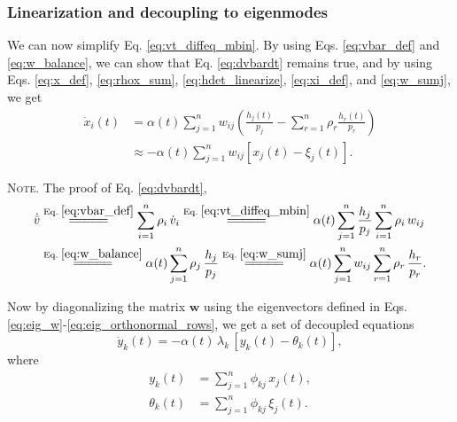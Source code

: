 \documentclass[reprint, floatfix]{revtex4-1}
\newcommand{\note}[1]{{\color{DarkGreen}\footnotesize \textsc{Note.} #1}}
\begin{document}
\subsubsection{Linearization and decoupling to eigenmodes}



We can now simplify Eq. \eqref{eq:vt_diffeq_mbin}.
%
By using Eqs. \eqref{eq:vbar_def}
and \eqref{eq:w_balance},
we can show that Eq. \eqref{eq:dvbardt}
remains true,
and by using Eqs.
\eqref{eq:x_def},
\eqref{eq:rhox_sum},
\eqref{eq:hdet_linearize},
\eqref{eq:xi_def},
and \eqref{eq:w_sumj}, we get
%
$$
\begin{aligned}
  \dot x_i(t)
  &= \alpha(t) \sum_{j=1}^n w_{ij}
  \left(
    \frac{ h_j(t) } { p_j }
    -
    \sum_{r = 1}^n
      \rho_r \frac{ h_r(t) } { p_r }
  \right)
  \\
  &\approx
  -\alpha(t) \sum_{j = 1}^n
  w_{ij} \left[ x_j(t) - \xi_j (t) \right]
  .
\end{aligned}
$$

\note{The proof of Eq. \eqref{eq:dvbardt},
$$
\begin{aligned}
  \dot{ \bar v }
  &
  \stackrel{\mathrm{Eq.\; \eqref{eq:vbar_def}}}
  {=\joinrel=\joinrel=\joinrel=\joinrel=}
  \sum_{i = 1}^n \rho_i \, \dot v_i
  \stackrel{\mathrm{Eq.\; \eqref{eq:vt_diffeq_mbin}}}
  {=\joinrel=\joinrel=\joinrel=\joinrel=}
  \alpha(t)
  \sum_{j = 1}^n \frac{ h_j } { p_j }
                 \sum_{ i = 1 }^{n} \rho_i \, w_{ij}
  \\
  &
  \stackrel{\mathrm{Eq.\; \eqref{eq:w_balance}}}
  {=\joinrel=\joinrel=\joinrel=\joinrel=}
  \alpha(t)
  \sum_{j = 1}^n \rho_j
    \, \frac{ h_j } { p_j }
  \stackrel{\mathrm{Eq.\; \eqref{eq:w_sumj}}}
  {=\joinrel=\joinrel=\joinrel=\joinrel=}
  \alpha(t)
  \sum_{j = 1}^n w_{ij}
  \sum_{r = 1}^n \rho_r
    \, \frac{ h_r } { p_r }
  .
\end{aligned}
$$
}

Now by diagonalizing the matrix $\mathbf w$
using the eigenvectors defined in Eqs.
\eqref{eq:eig_w}-\eqref{eq:eig_orthonormal_rows},
we get a set of decoupled equations
%
\begin{equation}
  \dot y_k(t)
  =
  -\alpha(t) \, \lambda_k \, [y_k(t) - \theta_k(t)],
\label{eq:yt_diffeq}
\end{equation}
%
where
\begin{align}
  y_k(t)
  &=
  \sum_{j=1}^n
    \phi_{kj} \, x_j(t)
  ,
  \label{eq:y_def}
  \\
  \theta_k(t)
  &=
  \sum_{j=1}^n
    \phi_{kj} \, \xi_j(t)
  .
  \label{eq:eta_def}
\end{align}
\end{document}
